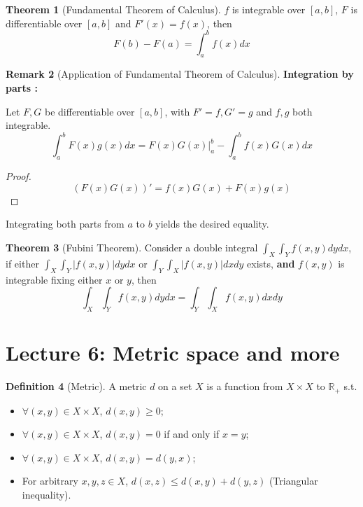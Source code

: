 \documentclass[12pt]{article}
\newcommand{\R}{{\mathbb R}}
\theoremstyle{definition}
\newtheorem{theorem}{Theorem}[section]
\newtheorem{definition}[theorem]{Definition}
\newtheorem{remark}[theorem]{Remark}
\theoremstyle{plain}
\begin{document}
\begin{theorem}
    [Fundamental Theorem of Calculus]
    $f$ is integrable over $[a,b]$, $F$ is differentiable over $[a,b]$ and
    $F'(x) = f(x)$, then
    \[
        F(b) - F(a) = \int_{a}^{b}f(x) dx
    \]
\end{theorem}

\begin{remark}
    [Application of Fundamental Theorem of Calculus]
    \textbf{Integration by parts : }

    Let $F, G$ be differentiable over $[a,b]$, with $F' = f, G' = g$ and $f,g$
    both integrable.
    \[
        \int_{a}^{b}F(x) g(x) dx = F(x) G(x) |_a^b - \int_{a}^{b}f(x) G(x) dx
    \]
    \begin{proof}
        \[
            \left( F(x) G(x) \right) ' = f(x) G(x) + F(x) g(x)
        \]
    \end{proof}
    Integrating both parts from $a$ to $b$ yields the desired equality.
\end{remark}

\begin{theorem}
    [Fubini Theorem]
    Consider a double integral $\int_X \int_Y f(x,y) dy dx$, if either $\int_X
    \int_Y |f(x,y)| dy dx$ or $\int_Y\int_X |f(x,y)|dx dy$ exists,
    \textbf{and} $f(x,y)$ is integrable fixing either $x$ or $y$, then
    \[
        \int_X \int_Y f(x,y) dy dx
        =
        \int_Y \int_X  f(x,y) dx dy
    \]
\end{theorem}


\section{Lecture 6: Metric space and more}
\begin{definition}
    [Metric]
    A metric $d$ on a set $X$ is a function from $X \times X$ to $\R_+$ s.t.
    \begin{itemize}
        \item $\forall (x,y) \in X \times X$, $d(x,y) \ge 0$;
        \item $\forall (x,y) \in X \times X$, $d(x,y) = 0$ if and only if $x = y$;
        \item $\forall (x,y) \in X \times X$, $d(x,y) = d(y,x)$;
        \item For arbitrary $x, y, z \in X$, $d(x,z) \le d(x,y) + d(y,z)$ (Triangular inequality).
    \end{itemize}
\end{definition}
\end{document}
